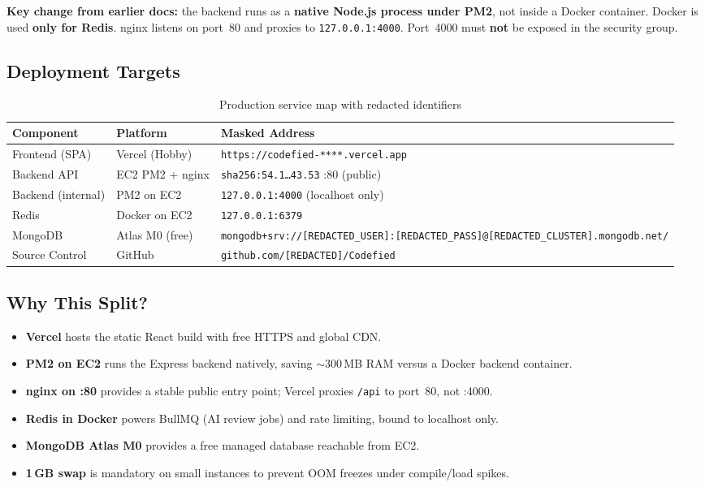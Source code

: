 \documentclass[11pt,a4paper]{article}
\makeatletter
\newcommand{\maskedectwoip}{\texttt{sha256:54.1\ldots 43.53}}
\newcommand{\maskedvercelurl}{\texttt{https://codefied-****.vercel.app}}
\newcommand{\maskedmongouri}{\texttt{mongodb+srv://[REDACTED\_USER]:[REDACTED\_PASS]@[REDACTED\_CLUSTER].mongodb.net/}}
\newcommand{\maskedgithub}{\texttt{github.com/[REDACTED]/Codefied}}
\makeatother
\begin{document}
\textbf{Key change from earlier docs:} the backend runs as a \textbf{native Node.js process under PM2}, not inside a Docker container. Docker is used \textbf{only for Redis}. nginx listens on port~80 and proxies to \texttt{127.0.0.1:4000}. Port~4000 must \textbf{not} be exposed in the security group.

\subsection{Deployment Targets}
\begin{table}[h]
\centering
\begin{tabular}{@{}lll@{}}
\toprule
\textbf{Component} & \textbf{Platform} & \textbf{Masked Address} \\
\midrule
Frontend (SPA)     & Vercel (Hobby)    & \maskedvercelurl \\
Backend API        & EC2 PM2 + nginx   & \maskedectwoip{} :80 (public) \\
Backend (internal) & PM2 on EC2        & \texttt{127.0.0.1:4000} (localhost only) \\
Redis              & Docker on EC2     & \texttt{127.0.0.1:6379} \\
MongoDB            & Atlas M0 (free)   & \maskedmongouri \\
Source Control     & GitHub            & \maskedgithub \\
\bottomrule
\end{tabular}
\caption{Production service map with redacted identifiers}
\end{table}

\subsection{Why This Split?}
\begin{itemize}[noitemsep]
  \item \textbf{Vercel} hosts the static React build with free HTTPS and global CDN.
  \item \textbf{PM2 on EC2} runs the Express backend natively, saving $\sim$300\,MB RAM versus a Docker backend container.
  \item \textbf{nginx on :80} provides a stable public entry point; Vercel proxies \texttt{/api} to port~80, not :4000.
  \item \textbf{Redis in Docker} powers BullMQ (AI review jobs) and rate limiting, bound to localhost only.
  \item \textbf{MongoDB Atlas M0} provides a free managed database reachable from EC2.
  \item \textbf{1\,GB swap} is mandatory on small instances to prevent OOM freezes under compile/load spikes.
\end{itemize}
\end{document}

